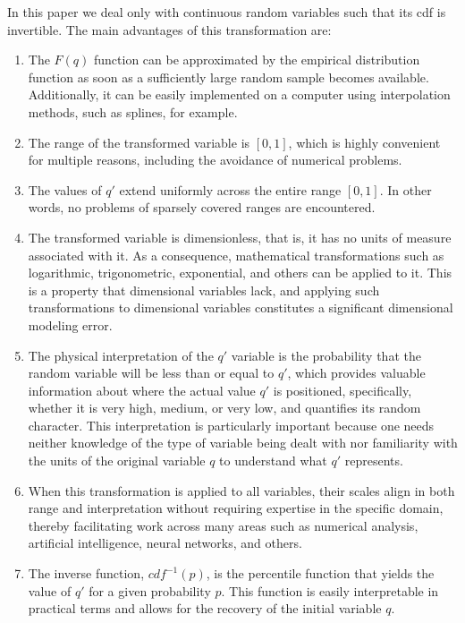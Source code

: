 \documentclass[
	11pt, %
	fleqn, %
	a4paper, %
]{LegrandOrangeBook}
\begin{document}
In this paper we deal only with continuous random variables such that its cdf is invertible. The main advantages of this transformation are:

\begin{enumerate}
\item The $F(q)$ function can be approximated by the empirical distribution function as soon as a sufficiently large random sample becomes available. Additionally, it can be easily implemented on a computer using interpolation methods, such as splines, for example.

\item The range of the transformed variable is $[0,1]$, which is highly convenient for multiple reasons, including the avoidance of numerical problems.

\item The values of $q'$ extend uniformly across the entire range $[0,1]$. In other words, no problems of sparsely covered ranges are encountered.

\item The transformed variable is dimensionless, that is, it has no units of measure associated with it. As a consequence, mathematical transformations such as logarithmic, trigonometric, exponential, and others can be applied to it. This is a property that dimensional variables lack, and applying such transformations to dimensional variables constitutes a significant dimensional modeling error.

\item The physical interpretation of the $q'$ variable is the probability that the random variable will be less than or equal to $q'$, which provides valuable information about where the actual value $q'$ is positioned, specifically, whether it is very high, medium, or very low, and quantifies its random character. This interpretation is particularly important because one needs neither knowledge of the type of variable being dealt with nor familiarity with the units of the original variable $q$ to understand what $q'$ represents.

\item When this transformation is applied to all variables, their scales align in both range and interpretation without requiring expertise in the specific domain, thereby facilitating work across many areas such as numerical analysis, artificial intelligence, neural networks, and others.

\item The inverse function, $cdf^{-1}(p)$, is the percentile function that yields the value of $q'$ for a given probability $p$. This function is easily interpretable in practical terms and allows for the recovery of the initial variable $q$.


\end{enumerate}
\end{document}
